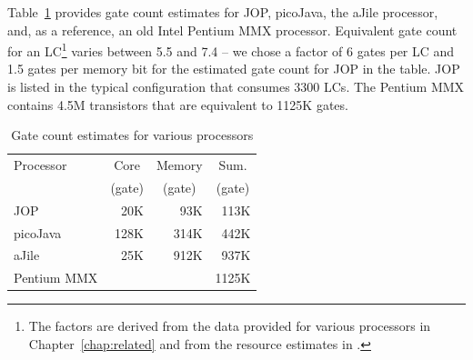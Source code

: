 


Table~\ref{tab:results:gate:count} provides gate count estimates for
JOP, picoJava, the aJile processor, and, as a reference, an old Intel
Pentium MMX processor. Equivalent gate count for an LC\footnote{The
factors are derived from the data provided for various processors in
Chapter~\ref{chap:related} and from the resource estimates in
\cite{jop:stack}.} varies between 5.5 and 7.4 -- we chose a factor of
6 gates per LC and 1.5 gates per memory bit for the estimated gate
count for JOP in the table. JOP is listed in the typical
configuration that consumes 3300 LCs. The Pentium MMX contains 4.5M
transistors \cite{pentium:mmx} that are equivalent to 1125K gates.

%

\begin{table}
    \centering
    \begin{tabular}{lrrr}
        \toprule
        Processor & \multicolumn{1}{c}{Core} & \multicolumn{1}{c}{Memory} & \multicolumn{1}{c}{Sum.} \\
        & \multicolumn{1}{c}{(gate)} & \multicolumn{1}{c}{(gate)} & \multicolumn{1}{c}{(gate)}\\
        \midrule
        JOP & 20K & 93K & 113K\\
        picoJava & 128K & 314K & 442K\\
        aJile & 25K & 912K & 937K\\
        Pentium MMX & & & 1125K\\
        \bottomrule
    \end{tabular}
    \caption{Gate count estimates for various processors}
    \label{tab:results:gate:count}
\end{table}


